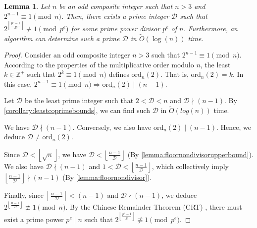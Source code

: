 \documentclass{article}
\theoremstyle{plain}
\theoremstyle{definition}
\newtheorem{lemma}{Lemma}
\newcommand{\floor}[1]{\left\lfloor #1 \right\rfloor}
\newcommand{\ord}{\text{ord}}
\newcommand{\D}{\mathcal{D}}
\newcommand{\primep}{p}
\begin{document}
\begin{lemma} \label{lemma:dthpowerincongruencemodprimepower}
\textit{Let $n$ be an odd composite integer such that $n > 3$ and $2^{n-1} \equiv 1 \pmod{n}$. Then, there exists a prime integer $\D$ such that $2^{\floor{\frac{\primep^e-1}{\D}}} \not\equiv 1 \pmod{\primep^e}$ for some prime power divisor $\primep^e$ of $n$. Furthermore, an algorithm can determine such a prime $\D$ in $\tilde{O}(\log(n))$ time.}
\end{lemma}
\begin{proof}
Consider an odd composite integer $n > 3$ such that $2^{n-1} \equiv 1 \pmod{n}$. According to the properties of the multiplicative order modulo $n$, the least $k \in \mathbb{Z}^+$ such that $2^k \equiv 1 \pmod{n}$ defines $\ord_n(2)$. That is, $\ord_n(2) = k$. In this case, $2^{n-1} \equiv 1 \pmod{n} \Rightarrow \ord_n(2) \mid (n-1)$.

Let $\D$ be the least prime integer such that $2 < \D < n$ and $\D \nmid (n-1)$. By \cref{corollary:leastcoprimebounds}, we can find such $\D$ in $\tilde{O}(log(n))$ time.

We have $\D \nmid (n-1)$. Conversely, we also have $\ord_n(2) \mid (n-1)$. Hence, we deduce $\D \not= \ord_n(2)$. 

Since $\D < \left\lfloor\sqrt{n}\right\rfloor$, we have $\D < \left\lfloor \frac{n-1}{\D} \right\rfloor$ (By \cref{lemma:floornondivisorupperbound}). We also have $\D \nmid (n-1)$ and $1 < \D < \left\lfloor \frac{n-1}{\D} \right\rfloor$, which collectively imply $\left\lfloor \frac{n-1}{\D} \right\rfloor \nmid (n-1)$ (By \cref{lemma:floornondivisor}).

Finally, since $\left\lfloor\frac{n-1}{\D}\right\rfloor < (n-1)$ and $\D \nmid (n-1)$, we deduce $2^{\left\lfloor\frac{n-1}{\D}\right\rfloor} \not\equiv 1 \pmod{n}$. By the Chinese Remainder Theorem (CRT) \cite{cormen2009algorithms}, there must exist a prime power $\primep^e \mid n$ such that $2^{\left\lfloor\frac{\primep^e-1}{\D}\right\rfloor} \not\equiv 1 \pmod{\primep^e}$.
\end{proof}
\end{document}
